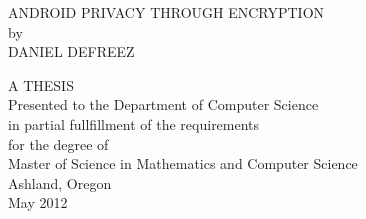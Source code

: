 \begin{titlepage}

\singlespacing
\begin{center}

ANDROID PRIVACY THROUGH ENCRYPTION \\[2.25in]
by \\[0.25in]
DANIEL DEFREEZ

\vfill

A THESIS \\[0.25in]
Presented to the Department of Computer Science \\
in partial fullfillment of the requirements \\
for the degree of \\[0.25in]
Master of Science in Mathematics and Computer Science \\[0.25in]

Ashland, Oregon \\
May 2012

\end{center}

\end{titlepage}
